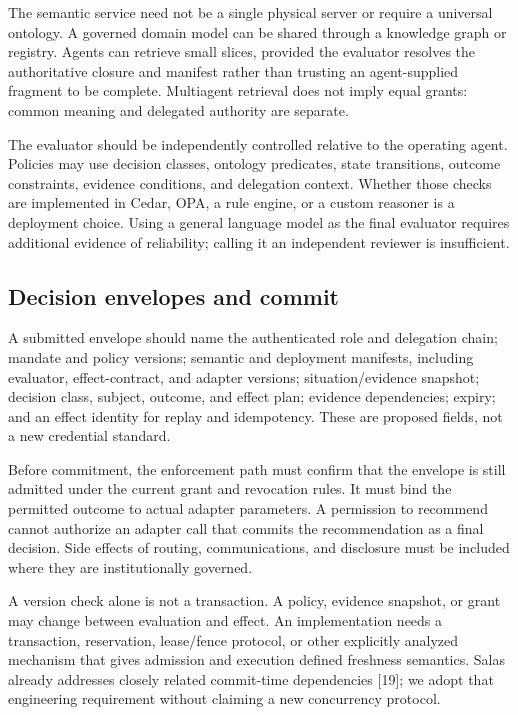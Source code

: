 \documentclass[
  english,
  12pt,
  a4paper,
  preprint,
  numbers,
  nopreprintline]{elsarticle}
\begin{document}
The semantic service need not be a single physical server or require a
universal ontology. A governed domain model can be shared through a
knowledge graph or registry. Agents can retrieve small slices, provided
the evaluator resolves the authoritative closure and manifest rather
than trusting an agent-supplied fragment to be complete. Multiagent
retrieval does not imply equal grants: common meaning and delegated
authority are separate.

The evaluator should be independently controlled relative to the
operating agent. Policies may use decision classes, ontology predicates,
state transitions, outcome constraints, evidence conditions, and
delegation context. Whether those checks are implemented in Cedar, OPA,
a rule engine, or a custom reasoner is a deployment choice. Using a
general language model as the final evaluator requires additional
evidence of reliability; calling it an independent reviewer is
insufficient.

\subsection{Decision envelopes and
commit}\label{decision-envelopes-and-commit}

A submitted envelope should name the authenticated role and delegation
chain; mandate and policy versions; semantic and deployment manifests,
including evaluator, effect-contract, and adapter versions;
situation/evidence snapshot; decision class, subject, outcome, and
effect plan; evidence dependencies; expiry; and an effect identity for
replay and idempotency. These are proposed fields, not a new credential
standard.

Before commitment, the enforcement path must confirm that the envelope
is still admitted under the current grant and revocation rules. It must
bind the permitted outcome to actual adapter parameters. A permission to
recommend cannot authorize an adapter call that commits the
recommendation as a final decision. Side effects of routing,
communications, and disclosure must be included where they are
institutionally governed.

A version check alone is not a transaction. A policy, evidence snapshot,
or grant may change between evaluation and effect. An implementation
needs a transaction, reservation, lease/fence protocol, or other
explicitly analyzed mechanism that gives admission and execution defined
freshness semantics. Salas already addresses closely related commit-time
dependencies {[}19{]}; we adopt that engineering requirement without
claiming a new concurrency protocol.
\end{document}
